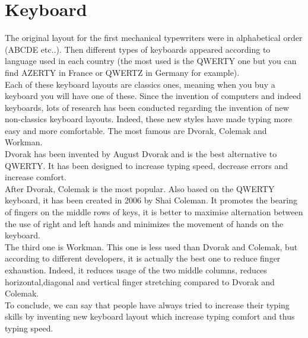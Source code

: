 \section{Keyboard}
The original layout for the first mechanical typewriters were in alphabetical order (ABCDE etc..). Then different types of keyboards appeared according to language used in each country (the most used is the QWERTY one but you can find AZERTY in France or QWERTZ in Germany for example).\\
Each of these keyboard layouts are classics ones, meaning when you buy a keyboard you will have one of these. Since the invention of computers and indeed keyboards, lots of research has been conducted regarding the invention of new non-classics keyboard layouts. Indeed, these new styles have made typing more easy and more comfortable. The most famous are Dvorak, Colemak and Workman.\\
Dvorak has been invented by August Dvorak and is the best alternative to QWERTY. It has been designed to increase typing speed, decrease errors and increase comfort.\\
After Dvorak, Colemak is the most popular. Also based on the QWERTY keyboard, it has been created in 2006 by Shai Coleman. It promotes the bearing of fingers on the middle rows of keys, it is better to maximise alternation between the use of right and left hands and minimizes the movement of hands on the keyboard.\\
The third one is Workman. This one is less used than Dvorak and Colemak, but according to different developers, it is actually the best one to reduce finger exhaustion. Indeed, it reduces usage of the two middle columns, reduces horizontal,diagonal and vertical finger stretching compared to Dvorak and Colemak.\cite{ref6}\\
To conclude, we can say that people have always tried to increase their typing skills by inventing new keyboard layout which increase typing comfort and thus typing speed.     

